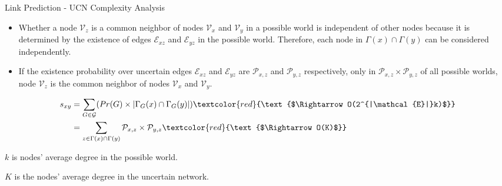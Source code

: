 \documentclass[9pt]{beamer}
\begin{document}
\begin{frame}{Link Prediction - UCN Complexity Analysis}
\begin{itemize}
\item Whether a node $\mathcal{V}_z$ is a common neighbor of nodes $\mathcal{V}_x$ and $\mathcal{V}_y$ in a possible world is independent of other nodes because it is determined by the existence of edges $\mathcal{E}_{xz}$ and $\mathcal{E}_{yz}$ in the possible world. Therefore, each node in $\Gamma(x)\cap\Gamma(y)$ can be considered independently. 
\item If the existence probability over uncertain edges $\mathcal{E}_{xz}$ and $\mathcal{E}_{yz}$ are $\mathcal{P}_{x,z}$ and $\mathcal{P}_{y,z}$ respectively, only in $\mathcal{P}_{x,z}\times\mathcal{P}_{y,z}$ of all possible worlds, node $\mathcal{V}_z$ is the common neighbor of nodes $\mathcal{V}_x$ and $\mathcal{V}_y$.
\end{itemize}


\begin{align*}
s_{xy}&=\sum_{G\in \mathcal{G}}( Pr(G)\times|\Gamma_G(x)\cap\Gamma_G(y)|) \textcolor{red}{\text{$\Rightarrow O(2^{|\mathcal{E}|}k)$}}\\
&=\sum_{z\in \Gamma(x)\cap\Gamma(y)}\mathcal{P}_{x,z}\times\mathcal{P}_{y,z} \textcolor{red}{\text{$\Rightarrow O(K)$}}
\end{align*}


$k$ is nodes' average degree in the possible world.

$K$ is the nodes' average degree in the uncertain network.
\end{frame}


\end{document}
